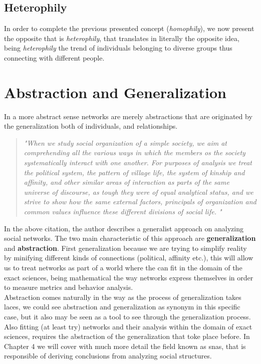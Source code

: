 \subsection*{Heterophily}

In order to complete the previous presented concept (\textit{homophily}), we now present the opposite that is \textit{heterophily}, that translates in literally the opposite idea, being \textit{heterophily} the trend of individuals belonging to diverse groups thus connecting with different people.


\section{Abstraction and Generalization}

In a more abstract sense networks are merely abstractions that are originated by the generalization both of individuals, and relationships.\\

\begin{quote}
\textit{"When we study social organization of a simple society, we aim at comprehending all the various ways in which the members os the society systematically interact with one another. For purposes of analysis we treat the political system, the pattern of village life, the system of kinship and affinity, and other similar areas of interaction as parts of the same universe of discourse, as tough they were of equal analytical status, and we strive to show how the same external factors, principals of organization and common values influence these different divisions of social life.
"}
\cite{barnes1954class}
\end{quote}

\indent In the above citation, the author describes a generalist approach on analyzing social networks. The two main characteristic of this approach are \textbf{generalization} and \textbf{abstraction}. First generalization because we are trying to simplify reality by minifying different kinds of connections (political, affinity etc.), this will allow us to treat networks as part of a world where the can fit in the domain of the exact sciences, being mathematical the way networks express themselves in order to measure metrics and behavior analysis.\\
\indent Abstraction comes naturally in the way as the process of generalization takes laces, we could see abstraction and generalization as synonym in this specific case, but it also may be seen as a tool to see through the generalization process. Also fitting (at least try) networks and their analysis within the domain of exact sciences, requires the abstraction of the generalization that toke place before. In Chapter 4 we will cover with much more detail the field known as \glspl{sna}, that is responsible of deriving conclusions from analyzing social structures.
